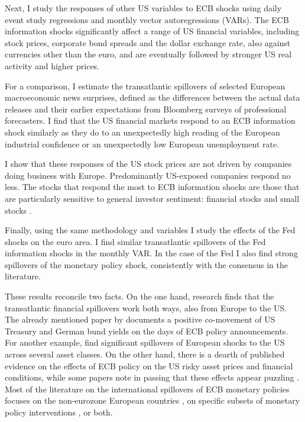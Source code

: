 \documentclass[a4paper,12pt]{article}
\begin{document}
Next, I study the responses of other US variables to ECB shocks
using daily event study regressions and monthly vector autoregressions (VARs).
The ECB information shocks significantly affect a range of US financial variables, 
including stock prices, corporate bond spreads and the dollar exchange rate, also against currencies
other than the euro, and are eventually followed by stronger US real activity and higher prices.

For a comparison, I estimate the transatlantic spillovers of selected European macroeconomic news surprises,
defined as the differences between the actual data releases and their earlier expectations from Bloomberg surveys of professional forecasters.
I find that the US financial markets respond to an ECB information shock similarly as they do
to an unexpectedly high reading of the European industrial confidence or an unexpectedly low European unemployment rate.

I show that these responses of the US stock prices are not driven by companies doing business with Europe.
Predominantly US-exposed companies respond no less. The stocks that respond the most to ECB information shocks are those that are particularly sensitive to general investor sentiment: financial stocks and small stocks \citep{Baker_Wurgler_2006}.

Finally, using the same methodology and variables I study the effects of the Fed shocks on the euro area. I find similar transatlantic spillovers of the Fed information shocks in the monthly VAR.
In the case of the Fed I also find strong spillovers of the monetary policy shock, consistently with the consensus in the literature.

These results reconcile two facts. On the one hand, research finds that the transatlantic financial spillovers work both ways, also from Europe to the US. The already mentioned paper by 
\cite{Curcuru_etal_2018} documents a positive co-movement of US Treasury and German bund yields on the days of ECB policy announcements. 
For another example, \cite{Ehrmann_etal_2011} find significant spillovers of European shocks to the US across several asset classes.
On the other hand, there is a dearth of published evidence on the effects of ECB policy on the US risky asset prices and financial conditions, while
some papers note in passing that these effects appear puzzling \citep{Rogers_Scotti_Wright_2014,Brusa_etal_2020}.
Most of the literature on the international spillovers of ECB monetary policies focuses on the non-eurozone European countries \citep[e.g.][]{Bluwstein_Canova_2016,Moder_2019,Feldkircher_etal_2020,terEllen_etal_2020,Corsetti_etal_2021},
on specific subsets of monetary policy interventions \citep{Georgiadis_Grab_2016}, or both.
\end{document}

